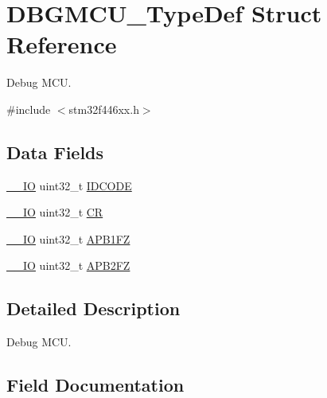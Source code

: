 \hypertarget{struct_d_b_g_m_c_u___type_def}{}\section{D\+B\+G\+M\+C\+U\+\_\+\+Type\+Def Struct Reference}
\label{struct_d_b_g_m_c_u___type_def}


Debug M\+CU.  




{\ttfamily \#include $<$stm32f446xx.\+h$>$}

\subsection*{Data Fields}
\begin{DoxyCompactItemize}
\item 
\mbox{\hyperlink{core__sc300_8h_aec43007d9998a0a0e01faede4133d6be}{\+\_\+\+\_\+\+IO}} uint32\+\_\+t \mbox{\hyperlink{struct_d_b_g_m_c_u___type_def_a24df28d0e440321b21f6f07b3bb93dea}{I\+D\+C\+O\+DE}}
\item 
\mbox{\hyperlink{core__sc300_8h_aec43007d9998a0a0e01faede4133d6be}{\+\_\+\+\_\+\+IO}} uint32\+\_\+t \mbox{\hyperlink{struct_d_b_g_m_c_u___type_def_ab40c89c59391aaa9d9a8ec011dd0907a}{CR}}
\item 
\mbox{\hyperlink{core__sc300_8h_aec43007d9998a0a0e01faede4133d6be}{\+\_\+\+\_\+\+IO}} uint32\+\_\+t \mbox{\hyperlink{struct_d_b_g_m_c_u___type_def_a5eaefc557573ae7bdc632ef6b6d574b5}{A\+P\+B1\+FZ}}
\item 
\mbox{\hyperlink{core__sc300_8h_aec43007d9998a0a0e01faede4133d6be}{\+\_\+\+\_\+\+IO}} uint32\+\_\+t \mbox{\hyperlink{struct_d_b_g_m_c_u___type_def_a4628a8c32f97ef93b15b2b503ef90c75}{A\+P\+B2\+FZ}}
\end{DoxyCompactItemize}


\subsection{Detailed Description}
Debug M\+CU. 

\subsection{Field Documentation}
\mbox{\label{struct_d_b_g_m_c_u___type_def_a5eaefc557573ae7bdc632ef6b6d574b5}} 
